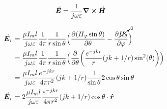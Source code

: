 \documentclass[12pt, letterpaper]{article}
\begin{document}
\pagebreak

\begin{align}
  \va*{E}
  &=
  {1\over j\omega\varepsilon}
  \curl\va*{H}
\end{align}

\begin{align}
  \va*{E}_r
  &=
  {\mu I_ml\over j\omega\varepsilon}
  {1\over4\pi}
  {1\over r\sin\theta}
  \Bigl(
    \pdv{(H_\varphi\sin\theta)}{\theta}
    -
    \pdv{\cancelto{0}{H_\theta}}{\varphi}
  \Bigr)
  \\
  &=
  {\mu I_ml\over j\omega\varepsilon}
  {1\over4\pi}
  {1\over r\sin\theta}
  \Bigl(
    \pdv{\theta}({e^{-jkr}\over r}(jk+1/r)\sin[2](\theta))
  \Bigr)
  \\
  &=
  {\mu I_ml\over j\omega\varepsilon}
  {e^{-jkr}\over4\pi r^2}(jk+1/r)
  {1\over \sin\theta}
  2\cos\theta\sin\theta
  \\
  \va*{E}_r
  &=
  2{\mu I_ml\over j\omega\varepsilon}
  {e^{-jkr}\over4\pi r^2}(jk+1/r)
  \cos\theta
  \cdot
  \vu*{r}
\end{align}
\end{document}
